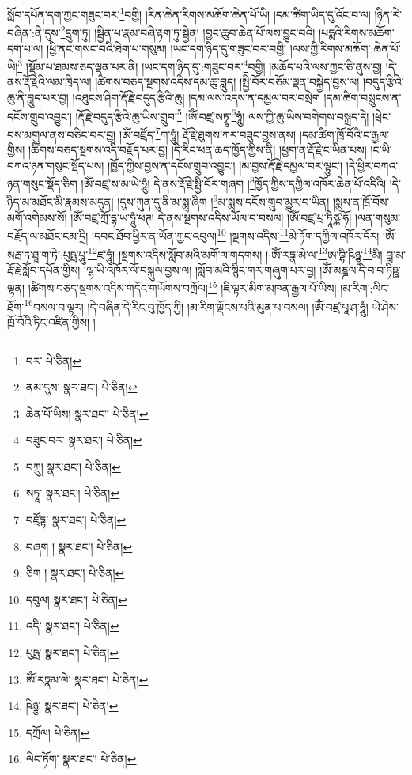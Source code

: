 སློབ་དཔོན་དག་ཀྱང་གཟུང་བར་\footnote{བར་  པེ་ཅིན། }བགྱི། །རིན་ཆེན་རིགས་མཆོག་ཆེན་པོ་ཡི། །དམ་ཚིག་ཡིད་དུ་འོང་བ་ལ། །ཉིན་རེ་བཞིན་:ནི་དུས་\footnote{ནམ་དུས་  སྣར་ཐང་།  པེ་ཅིན། }དྲུག་ཏུ། །སྦྱིན་པ་རྣམ་བཞི་རྟག་ཏུ་སྦྱིན། །བྱང་ཆུབ་ཆེན་པོ་ལས་བྱུང་བའི། །པདྨའི་རིགས་མཆོག་དག་པ་ལ། །ཕྱི་ནང་གསང་བའི་ཐེག་པ་གསུམ། །ཡང་དག་ཉིད་དུ་གཟུང་བར་བགྱི། །ལས་ཀྱི་རིགས་མཆོག་:ཆེན་པོ་ཡི།\footnote{ཆེན་པོ་ཡིས།  སྣར་ཐང་།  པེ་ཅིན། } །སྡོམ་པ་ཐམས་ཅད་ལྡན་པར་ནི། །ཡང་དག་ཉིད་དུ་:གཟུང་བར་\footnote{བཟུང་བར་  སྣར་ཐང་།  པེ་ཅིན། }བགྱི། །མཆོད་པའི་ལས་ཀྱང་ཅི་ནུས་བྱ། །དེ་ནས་རྡོ་རྗེའི་ལམ་ཁྲིད་ལ། །ཚིགས་བཅད་སྔགས་འདིས་དམ་ཆུ་བླུད། །སྤྱི་བོར་བཅོམ་ལྡན་བསྐྱེད་བྱས་ལ། །བདུད་རྩིའི་ཆུ་ནི་བླུད་པར་བྱ། །འཐུངས་ཤིག་རྡོ་རྗེ་བདུད་རྩིའི་ཆུ། །དམ་ལས་འདས་ན་དམྱལ་བར་བསྲེག །དམ་ཚིག་བསྲུངས་ན་དངོས་གྲུབ་འབྱུང་། །རྡོ་རྗེ་བདུད་རྩིའི་ཆུ་ཡིས་གྲུབ།\footnote{བཀྲུ།  སྣར་ཐང་།  པེ་ཅིན། } །ཨོཾ་བཛྲ་སཏྭཱ་\footnote{སཏཱ་  སྣར་ཐང་།  པེ་ཅིན། }ཧཱུཾ། ལས་ཀྱི་ཆུ་ཡིས་བགེགས་བསྐྲད་དེ། །ཕྲེང་བས་མགུལ་ནས་བཅིང་བར་བྱ། །ཨོཾ་བཛྲོད་\footnote{བཛྲོཏྟ་  སྣར་ཐང་།  པེ་ཅིན། }ཀ་ཧཱུཾ། རྡོ་རྗེ་ཐུགས་ཀར་བཟུང་བྱས་ནས། །དམ་ཚིག་ཁྲོ་བོའི་ང་རྒྱལ་གྱིས། །ཚིགས་བཅད་སྔགས་འདི་བརྗོད་པར་བྱ། །དེ་རིང་ཕན་ཆད་ཁྱོད་ཀྱིས་ནི། །ཕྱག་ན་རྡོ་རྗེ་ང་ཡིན་པས། །ང་ཡི་བཀའ་ཉན་གསུང་སྡོད་པས། །ཁྱོད་ཀྱིས་བྱས་ན་དངོས་གྲུབ་འབྱུང་། །མ་བྱས་རྡོ་རྗེ་དམྱལ་བར་ལྟུང་། །དེ་ཕྱིར་བཀའ་ཉན་གསུང་སྡོད་ཅིག །ཨོཾ་བཛྲ་ས་མ་ཡེ་ཧཱུཾ། དེ་ནས་རྡོ་རྗེ་སྤྱི་བོར་གཞག །\footnote{བཞག །  སྣར་ཐང་།  པེ་ཅིན། }ཁྱོད་ཀྱིས་དཀྱིལ་འཁོར་ཆེན་པོ་འདིའི། །དེ་ཉིད་མ་མཐོང་མི་རྣམས་མདུན། །དུས་ཀུན་དུ་ནི་མ་སྨྲ་ཞིག །\footnote{ཅིག །  སྣར་ཐང་།  པེ་ཅིན། }མ་སྨྲས་དངོས་གྲུབ་མྱུར་བ་ཡིན། །སྨྲས་ན་ཁྲོ་བོས་མགོ་འགེམས་སོ། །ཨོཾ་བཛྲ་ཀྲོ་དྷ་ཡ་ཧཱུཾ་ཕཊ། དེ་ནས་སྔགས་འདིས་ཡོལ་བ་བསལ། །ཨོཾ་བཛྲ་པྲ་ཏཱིཙྪ་ཧོ། །ལན་གསུམ་བརྗོད་ལ་མཐོང་ངམ་དྲི། །དབང་ཐོབ་ཕྱིར་ན་ཡོན་ཀྱང་འབུལ།\footnote{དབུལ།  སྣར་ཐང་།  པེ་ཅིན། } །སྔགས་འདིས་\footnote{འདི་  སྣར་ཐང་།  པེ་ཅིན། }མེ་ཏོག་དཀྱིལ་འཁོར་དོར། །ཨོཾ་སརྦ་ཏ་ཐཱ་ག་ཏེ་:པུཥྤ་པཱུ་\footnote{པུཥྤ་  སྣར་ཐང་།  པེ་ཅིན། }ཛ་ཧཱུཾ། །སྔགས་འདིས་སློབ་མའི་མགོ་ལ་གདགས། །:ཨོཾ་རཏྣ་མེ་ལ་\footnote{ཨོཾ་རཏྣམ་ལེ་  སྣར་ཐང་།  པེ་ཅིན། }ཨ་བྷི་ཥིཉྩཱ་\footnote{ཥིཉྩ་  སྣར་ཐང་།  པེ་ཅིན། }མི། བླ་མ་རྡོ་རྗེ་སློབ་དཔོན་གྱིས། །ལྷ་ཡི་འཁོར་ལོ་བསྐུལ་བྱས་ལ། །སློབ་མའི་སྙིང་གར་གཞུག་པར་བྱ། །ཨོཾ་མཎྜལ་དེ་བ་བ་ཏིཥྛ་ལྷན། །ཚིགས་བཅད་སྔགས་འདིས་གདོང་གཡོགས་བཀྲོལ།\footnote{དཀྲོལ།  པེ་ཅིན། } །ཇི་ལྟར་མིག་མཁན་རྒྱལ་པོ་ཡིས། །མ་རིག་:ལིང་ཐོག་\footnote{ལིང་ཏོག་  སྣར་ཐང་།  པེ་ཅིན། }བསལ་བ་ལྟར། །དེ་བཞིན་དེ་རིང་བུ་ཁྱོད་ཀྱི། །མ་རིག་ལྡོངས་པའི་མུན་པ་བསལ། །ཨོཾ་བཛྲ་པཱ་ཤ་ཧཱུཾ། ཡེ་ཤེས་ཁྲོ་བོའི་ཏིང་འཛིན་གྱིས། །
